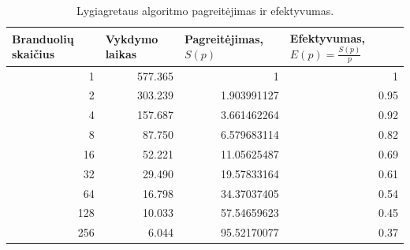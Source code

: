 \documentclass{VUMIFPSbakalaurinis}
\begin{document}
\begin{table}[]
    \begin{tabular}{|r|r|r|r|}
        \hline
        \multicolumn{1}{|l|}{Branduolių skaičius} & \multicolumn{1}{l|}{Vykdymo laikas} & \multicolumn{1}{l|}{Pagreitėjimas, $S(p)$} & \multicolumn{1}{l|}{Efektyvumas, $E(p)=\frac{S(p)}{p}$} \\ \hline
        1                                         & 577.365                             & 1                                          & 1                                                       \\ \hline
        2                                         & 303.239                             & 1.903991127                                & 0.95                                                    \\ \hline
        4                                         & 157.687                             & 3.661462264                                & 0.92                                                    \\ \hline
        8                                         & 87.750                              & 6.579683114                                & 0.82                                                    \\ \hline
        16                                        & 52.221                              & 11.05625487                                & 0.69                                                    \\ \hline
        32                                        & 29.490                              & 19.57833164                                & 0.61                                                    \\ \hline
        64                                        & 16.798                              & 34.37037405                                & 0.54                                                    \\ \hline
        128                                       & 10.033                              & 57.54659623                                & 0.45                                                    \\ \hline
        256                                       & 6.044                               & 95.52170077                                & 0.37                                                    \\ \hline
    \end{tabular}
    \caption{Lygiagretaus algoritmo pagreitėjimas ir efektyvumas. }
    \label{table:speedup}
\end{table}
\end{document}
